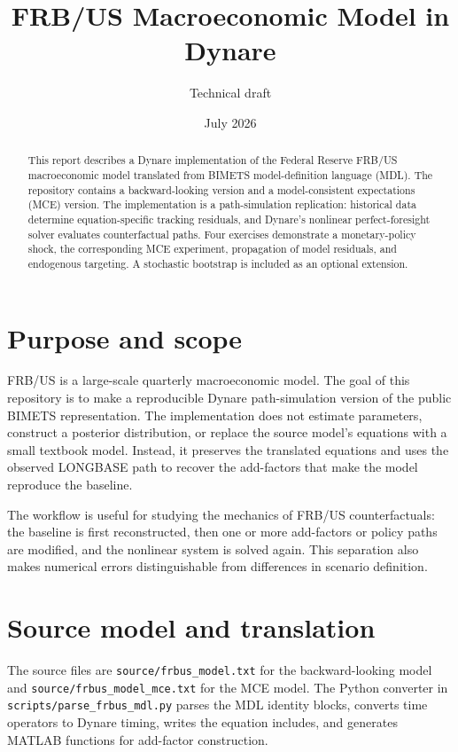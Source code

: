 \documentclass[11pt]{article}
\title{FRB/US Macroeconomic Model in Dynare}
\author{Technical draft}
\date{July 2026}
\begin{document}
\maketitle

\begin{abstract}
This report describes a Dynare implementation of the Federal Reserve FRB/US
macroeconomic model translated from BIMETS model-definition language (MDL).
The repository contains a backward-looking version and a model-consistent
expectations (MCE) version. The implementation is a path-simulation
replication: historical data determine equation-specific tracking residuals,
and Dynare's nonlinear perfect-foresight solver evaluates counterfactual
paths. Four exercises demonstrate a monetary-policy shock, the corresponding
MCE experiment, propagation of model residuals, and endogenous targeting. A
stochastic bootstrap is included as an optional extension.
\end{abstract}

\tableofcontents
\newpage

\section{Purpose and scope}

FRB/US is a large-scale quarterly macroeconomic model. The goal of this
repository is to make a reproducible Dynare path-simulation version of the
public BIMETS representation. The implementation does not estimate
parameters, construct a posterior distribution, or replace the source model's
equations with a small textbook model. Instead, it preserves the translated
equations and uses the observed LONGBASE path to recover the add-factors that
make the model reproduce the baseline.

The workflow is useful for studying the mechanics of FRB/US counterfactuals:
the baseline is first reconstructed, then one or more add-factors or policy
paths are modified, and the nonlinear system is solved again. This separation
also makes numerical errors distinguishable from differences in scenario
definition.

\section{Source model and translation}

The source files are \texttt{source/frbus\_model.txt} for the
backward-looking model and \texttt{source/frbus\_model\_mce.txt} for the MCE
model. The Python converter in
\texttt{scripts/parse\_frbus\_mdl.py} parses the MDL identity blocks, converts
time operators to Dynare timing, writes the equation includes, and generates
MATLAB functions for add-factor construction.
\end{document}
